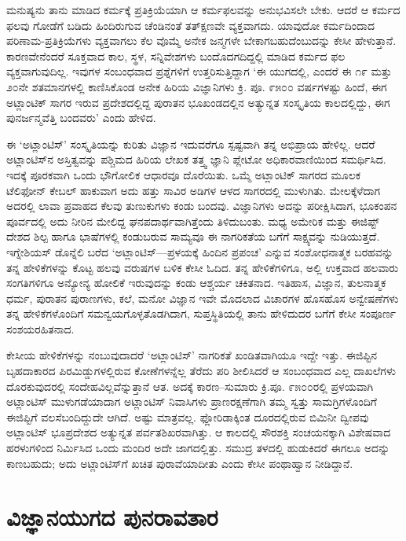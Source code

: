 ಮನುಷ್ಯನು ತಾನು ಮಾಡಿದ ಕರ್ಮಕ್ಕೆ ಪ್ರತಿಕ್ರಿಯೆಯಾಗಿ ಆ ಕರ್ಮಫಲವನ್ನು ಅನುಭವಿಸಲೇ ಬೇಕು. ಆದರೆ ಆ ಕರ್ಮದ ಫಲವು ಗೋಡೆಗೆ ಬಡಿದು ಹಿಂದಿರುಗುವ ಚೆಂಡಿನಂತೆ ತತ್​ಕ್ಷಣವೇ ವ್ಯಕ್ತವಾಗದು. ಯಾವುದೋ ಕರ್ಮದಿಂದಾದ ಪರಿಣಾಮ-ಪ್ರತಿಕ್ರಿಯೆಗಳು ವ್ಯಕ್ತವಾಗಲು ಕೆಲ ವೊಮ್ಮೆ ಅನೇಕ ಜನ್ಮಗಳೇ ಬೇಕಾಗಬಹುದೆಂಬುದನ್ನು ಕೇಸೀ ಹೇಳುತ್ತಾನೆ. ಕಾರಣವೇನೆಂದರೆ ಸೂಕ್ತವಾದ ಕಾಲ, ಸ್ಥಳ, ಸನ್ನಿವೇಶಗಳು ಬಂದೊದಗದಿದ್ದಲ್ಲಿ ಮಾಡಿದ ಕರ್ಮದ ಫಲ ವ್ಯಕ್ತವಾಗುವುದಿಲ್ಲ. ಇವುಗಳ ಸಂಬಂಧವಾದ ಪ್ರಶ್ನೆಗಳಿಗೆ ಉತ್ತರಿಸುತ್ತಿದ್ದಾಗ ‘ಈ ಯುಗದಲ್ಲಿ, ಎಂದರೆ ಈ ೧೯ ಮತ್ತು ೨೦ನೇ ಶತಮಾನಗಳಲ್ಲಿ ಕಾಣಿಸಿಕೊಂಡ ಅನೇಕ ಹಿರಿಯ ವಿಜ್ಞಾನಿಗಳು ಕ್ರಿ. ಪೂ. ೯೫೦೦ ವರ್ಷಗಳಷ್ಟು ಹಿಂದೆ, ಈಗ ಅಟ್ಲಾಂಟಿಕ್ ಸಾಗರ ಇರುವ ಪ್ರದೇಶದಲ್ಲಿದ್ದ ಪುರಾತನ ಭೂಖಂಡದಲ್ಲಿನ ಅತ್ಯುನ್ನತ ಸಂಸ್ಕೃತಿಯ ಕಾಲದಲ್ಲಿದ್ದು, ಈಗ ಪುನರ್ಜನ್ಮವೆತ್ತಿ ಬಂದವರು’ ಎಂದು ಹೇಳಿದ.

ಈ ‘ಅಟ್ಲಾಂಟಿಸ್​’ ಸಂಸ್ಕೃತಿಯನ್ನು ಕುರಿತು ವಿಜ್ಞಾನ ಇದುವರೆಗೂ ಸ್ಪಷ್ಟವಾಗಿ ತನ್ನ ಅಭಿಪ್ರಾಯ ಹೇಳಿಲ್ಲ. ಆದರೆ ಅಟ್ಲಾಂಟಿಸ್​ನ ಅಸ್ತಿತ್ವವನ್ನು ಪಶ್ಚಿಮದ ಹಿರಿಯ ಲೇಖಕ ತತ್ತ್ವ ಜ್ಞಾನಿ ಪ್ಲೇಟೋ ಅಧಿಕಾರವಾಣಿಯಿಂದ ಸಮರ್ಥಿಸಿದ. ಇದಕ್ಕೆ ಪೂರಕವಾಗಿ ಒಂದು ಭೌಗೋಲಿಕ ಆಧಾರವೂ ದೊರೆಯಿತು. ಒಮ್ಮೆ ಅಟ್ಲಾಂಟಿಕ್ ಸಾಗರದ ಮೂಲಕ ಟೆಲಿಫೋನ್ ಕೇಬಲ್ ಹಾಕುವಾಗ ಅದು ಹತ್ತು ಸಾವಿರ ಅಡಿಗಳ ಆಳದ ಸಾಗರದಲ್ಲಿ ಮುಳುಗಿತು. ಮೇಲಕ್ಕೆಳೆದಾಗ ಅದರಲ್ಲಿ ಲಾವಾ ಪ್ರವಾಹದ ಕೆಲವು ತುಣುಕುಗಳು ಕಂಡು ಬಂದವು. ವಿಜ್ಞಾನಿಗಳು ಅದನ್ನು ಪರೀಕ್ಷಿಸಿದಾಗ, ಭೂಕಂಪನ ಪೂರ್ವದಲ್ಲಿ ಅದು ನೀರಿನ ಮೇಲಿದ್ದ ಘನಪದಾರ್ಥವಾಗಿತ್ತೆಂದು ತಿಳಿದುಬಂತು. ಮಧ್ಯ ಅಮೇರಿಕ ಮತ್ತು ಈಜಿಪ್ಟ್ ದೇಶದ ಶಿಲ್ಪ ಹಾಗೂ ಭಾಷೆಗಳಲ್ಲಿ ಕಂಡುಬರುವ ಸಾಮ್ಯವೂ ಈ ನಾಗರಿಕತೆಯ ಬಗೆಗೆ ಸಾಕ್ಷ್ಯವನ್ನು ನುಡಿಯುತ್ತದೆ. ಇಗ್ನೇಶಿಯಸ್ ಡೊನ್ನೆಲಿ ಬರೆದ ‘ಅಟ್ಲಾಂಟಿಸ್​—ಪ್ರಳಯಕ್ಕೆ ಹಿಂದಿನ ಪ್ರಪಂಚ’ ಎನ್ನುವ ಸಂಶೋಧನಾತ್ಮಕ ಬರಹವನ್ನು ತನ್ನ ಹೇಳಿಕೆಗಳನ್ನು ಕೊಟ್ಟ ಹಲವು ವರುಷಗಳ ಬಳಿಕ ಕೇಸೀ ಓದಿದ. ತನ್ನ ಹೇಳಿಕೆಗಳಿಗೂ, ಅಲ್ಲಿ ಉಕ್ತವಾದ ಹಲವಾರು ಸಂಗತಿಗಳಿಗೂ ಅನ್ಯೋನ್ಯ ಹೋಲಿಕೆ ಇರುವುದನ್ನು ಕಂಡು ಆಶ್ಚರ್ಯ ಚಕಿತನಾದ. ಇತಿಹಾಸ, ವಿಜ್ಞಾನ, ತುಲನಾತ್ಮಕ ಧರ್ಮ, ಪುರಾತನ ಪುರಾಣಗಳು, ಕಲೆ, ಮನೋ ವಿಜ್ಞಾನ ಇವೇ ಮೊದಲಾದ ವಿಚಾರಗಳ ಹೊಸಹೊಸ ಅನ್ವೇಷಣೆಗಳು ತನ್ನ ಹೇಳಿಕೆಗಳೊಂದಿಗೆ ಸಮನ್ವಯಗೊಳ್ಳತೊಡಗಿದಾಗ, ಸುಪ್ತಸ್ಥಿತಿಯಲ್ಲಿ ತಾನು ಹೇಳಿದುದರ ಬಗೆಗೆ ಕೇಸೀ ಸಂಪೂರ್ಣ ಸಂಶಯರಹಿತನಾದ.

ಕೇಸೀಯ ಹೇಳಿಕೆಗಳನ್ನು ನಂಬುವುದಾದರೆ ‘ಅಟ್ಲಾಂಟಿಸ್​’ ನಾಗರಿಕತೆ ಖಂಡಿತವಾಗಿಯೂ ಇದ್ದೇ ಇತ್ತು. ಈಜಿಪ್ಟಿನ ಬೃಹದಾಕಾರದ ಪಿರಮಿಡ್ಡುಗಳಲ್ಲಿರುವ ಕೋಣೆಗಳನ್ನೆಲ್ಲ ತೆರೆದು ಪರಿ ಶೀಲಿಸಿದರೆ ಆ ಸಂಬಂಧವಾದ ಎಲ್ಲ ದಾಖಲೆಗಳು ದೊರಕುವುದರಲ್ಲಿ ಸಂದೇಹವಿಲ್ಲವೆನ್ನುತ್ತಾನೆ ಆತ. ಅದಕ್ಕೆ ಕಾರಣ–ಸುಮಾರು ಕ್ರಿ.ಪೂ. ೯೫೦೦ರಲ್ಲಿ ಪ್ರಳಯವಾಗಿ ಅಟ್ಲಾಂಟಿಸ್ ಮುಳುಗಡೆಯಾದಾಗ ಅಟ್ಲಾಂಟಿಸ್ ನಿವಾಸಿಗಳು ಪ್ರಾಣರಕ್ಷಣೆಗಾಗಿ ತಮ್ಮ ಸ್ವತ್ತು ಸಾಮಗ್ರಿಗಳೊಂದಿಗೆ ಈಜಿಪ್ಟಿಗೆ ವಲಸೆಬಂದಿದ್ದುದೇ ಆಗಿದೆ. ಅಷ್ಟು ಮಾತ್ರವಲ್ಲ. ಫ್ಲೋರಿಡಾಕ್ಕಿಂತ ದೂರದಲ್ಲಿರುವ ಬಿಮಿನೀ ದ್ವೀಪವು ಅಟ್ಲಾಂಟಿಸ್ ಭೂಪ್ರದೇಶದ ಅತ್ಯುನ್ನತ ಪರ್ವತಶಿಖರವಾಗಿತ್ತು. ಆ ಕಾಲದಲ್ಲಿ ಸೌರಶಕ್ತಿ ಸಂಚಯನಕ್ಕಾಗಿ ವಿಶೇಷವಾದ ಹರಳುಗಳಿಂದ ನಿರ್ಮಿಸಿದ ಒಂದು ಮಂದಿರ ಅದೇ ಜಾಗದಲ್ಲಿತ್ತು. ಸಮುದ್ರ ತಳದಲ್ಲಿ ಹುಡುಕಿದರೆ ಈಗಲೂ ಅದನ್ನು ಕಾಣಬಹುದು; ಅದು ಅಟ್ಲಾಂಟಿಸ್​ಗೆ ಖಚಿತ ಪುರಾವೆಯಾದೀತು ಎಂದು ಕೇಸೀ ಪಂಥಾಹ್ವಾನ ನೀಡಿದ್ದಾನೆ.


\section{ವಿಜ್ಞಾನಯುಗದ ಪುನರಾವತಾರ}

